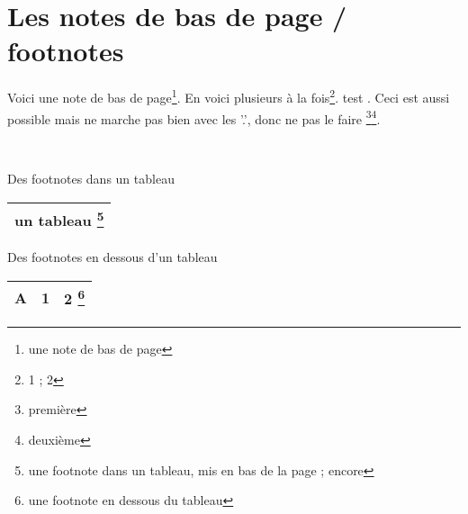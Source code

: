 \section{Les notes de bas de page / footnotes}

Voici une note de bas de page\footnote{une note de bas de page}. En voici plusieurs à la fois\footnote{1 ; 2}. test . Ceci est aussi possible mais ne marche pas bien avec les '.', donc ne pas le faire \footnote{première}\footnote{deuxième}.

~~

Des footnotes dans un tableau 

\begin{savenotes}
	\begin{tabular}{c} 
		\toprule
     	un tableau \footnote{une footnote dans un tableau, mis en bas de la page ; encore} \\
		\bottomrule
	\end{tabular}
\end{savenotes}

Des footnotes en dessous d'un tableau 


	\begin{minipage}{3cm}
	\begin{tabular}{lcc}
        \toprule
        A & 1 & 2 \footnote{une footnote en dessous du tableau} \\
        \bottomrule
    \end{tabular}
	\end{minipage}


